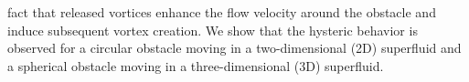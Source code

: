 \documentclass[12pt,a4paper]{report} %
\begin{document}
fact that released vortices enhance the flow velocity around
the obstacle and induce subsequent vortex creation. We show
that the hysteric behavior is observed for a circular obstacle
moving in a two-dimensional (2D) superfluid and a spherical
obstacle moving in a three-dimensional (3D) superfluid.
\end{document}
